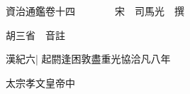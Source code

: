 






























































資治通鑑卷十四　　　　宋　司馬光　撰

胡三省　音註

漢紀六|{
	起閼逢困敦盡重光協洽凡八年}


太宗孝文皇帝中

